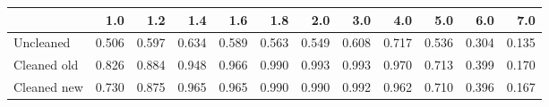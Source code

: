\begin{tabular}{lrrrrrrrrrrr}
\toprule
{} &   1.0 &   1.2 &   1.4 &   1.6 &   1.8 &   2.0 &   3.0 &   4.0 &   5.0 &   6.0 &   7.0 \\
\midrule
Uncleaned   & 0.506 & 0.597 & 0.634 & 0.589 & 0.563 & 0.549 & 0.608 & 0.717 & 0.536 & 0.304 & 0.135 \\
Cleaned old & 0.826 & 0.884 & 0.948 & 0.966 & 0.990 & 0.993 & 0.993 & 0.970 & 0.713 & 0.399 & 0.170 \\
Cleaned new & 0.730 & 0.875 & 0.965 & 0.965 & 0.990 & 0.990 & 0.992 & 0.962 & 0.710 & 0.396 & 0.167 \\
\bottomrule
\end{tabular}
